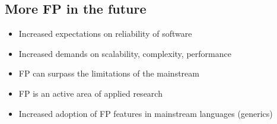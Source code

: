 \subsection{More FP in the future}
\begin{itemize}
    \item Increased expectations on reliability of software
    \item Increased demands on scalability, complexity, performance
    \item FP can surpass the limitations of the mainstream
    \item FP is an active area of applied research
    \item Increased adoption of FP features in mainstream languages (generics)
\end{itemize}
\columnbreak





